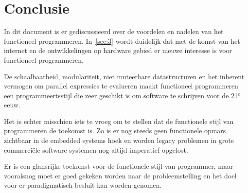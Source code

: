 \documentclass[twoside,twocolumn]{article}
\begin{document}
\section{Conclusie}
\label{sec:5}

In dit document is er gediscussieerd over de voordelen en nadelen van het
functioneel programmeren. In~\cref{sec:3} wordt duidelijk dat met de komst van
het internet en de ontwikkelingen op hardware gebied er nieuwe interesse is
voor functioneel programmeren.

De schaalbaarheid, modulariteit, niet muteerbare datastructuren en het inherent
vermogen om parallel expressies te evalueren maakt functioneel programmeren een
programmeertsstijl die zeer geschikt is om software te schrijven voor de 21$^e$
eeuw.

Het is echter misschien iets te vroeg om te stellen dat de functionele stijl
van programmeren de toekomst is. Zo is er nog steeds geen functionele opmars
zichtbaar in de embedded systems hoek en worden legacy problemen in grote
commerci\"ele software systemen nog altijd imperatief opgelost.

Er is een glansrijke toekomst voor de functionele stijl van programmer, maar
vooralsnog moet er goed gekeken worden naar de probleemstelling en het doel
voor er paradigmatisch besluit kan worden genomen.


\printbibliography

\clearpage
\onecolumn

\end{document}
